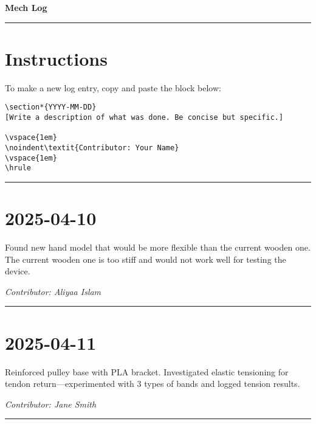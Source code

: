 \documentclass[12pt]{article}
\begin{document}
\begin{center}
    {\Huge\bfseries Mech Log}
\end{center}
\vspace{1em}
\hrule
\vspace{1em}

\section*{Instructions}
To make a new log entry, copy and paste the block below:

\begin{verbatim}
\section*{YYYY-MM-DD}
[Write a description of what was done. Be concise but specific.]

\vspace{1em}
\noindent\textit{Contributor: Your Name}
\vspace{1em}
\hrule
\end{verbatim}

\vspace{1em}
\hrule
\vspace{1em}


\section*{2025-04-10}
Found new hand model that would be more flexible than the current wooden one. The current wooden one is too stiff and would not work well for testing the device.

\vspace{1em}
\noindent\textit{Contributor: Aliyaa Islam}
\vspace{1em}
\hrule

\section*{2025-04-11}
Reinforced pulley base with PLA bracket. Investigated elastic tensioning for tendon return—experimented with 3 types of bands and logged tension results.

\vspace{1em}
\noindent\textit{Contributor: Jane Smith}
\vspace{1em}
\hrule

\end{document}
